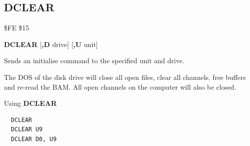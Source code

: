 
\newpage
\subsection{DCLEAR}
\begin{description}[leftmargin=2cm,style=nextline]
\item [Token:] \$FE \$15
\item [Format:] {\bf DCLEAR} [{\bf,D} drive] [{\bf,U} unit]
\item [Usage:]
   Sends an initialise command to the specified unit and drive.

   \drivedefinition

   \unitdefinition

   The DOS of the disk drive will close all open files,
   clear all channels, free buffers and re-read the BAM.
   All open channels on the computer will also be closed.

\item [Examples:] Using {\bf DCLEAR}
\begin{tcolorbox}[colback=black,coltext=white]
\verbatimfont{\codefont}
\begin{verbatim}
  DCLEAR
  DCLEAR U9
  DCLEAR D0, U9
\end{verbatim}
\end{tcolorbox}
\end{description}


\newpage
